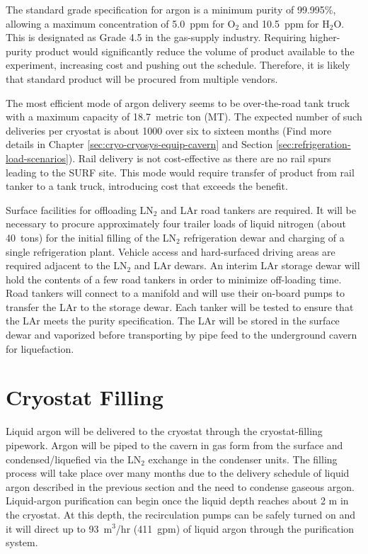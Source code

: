 The standard grade specification for argon is a minimum purity of
 99.995\%, allowing a maximum concentration of 5.0~ppm for O$_2$ 
and 10.5~ppm for H$_{2}$O.  This is designated as Grade 4.5 in 
the gas-supply industry.  Requiring higher-purity product would 
significantly reduce the volume of product available to the 
experiment, increasing cost and pushing out the schedule.  
Therefore, it is likely that standard product will be 
procured from multiple vendors.  

The most efficient mode of argon delivery seems to be
over-the-road tank truck with a maximum capacity of 18.7~metric ton (MT).  
The expected number of such deliveries per cryostat is about 1000 
over six to sixteen months (Find more details in 
Chapter \ref{sec:cryo-cryosys-equip-cavern} and Section 
\ref{sec:refrigeration-load-scenarios}). 
Rail delivery is not cost-effective as there are no rail spurs leading
to the SURF site. This mode would require transfer of product from rail 
tanker to a tank truck, introducing cost that exceeds the benefit.

Surface facilities for offloading LN$_{2}$ and LAr road tankers are 
required. It will be necessary to  procure approximately four trailer 
loads of liquid nitrogen (about 40~tons) for the initial filling of 
the LN$_{2}$ refrigeration dewar and charging of a single refrigeration 
plant. Vehicle access and hard-surfaced driving areas are required 
adjacent to the LN$_{2}$ and LAr dewars. An interim 
LAr storage dewar will hold the contents of a few road tankers in order 
to minimize off-loading time.  Road tankers will connect to a 
manifold and will use their on-board pumps to transfer the LAr 
to the storage dewar. Each tanker will be tested to ensure that 
the LAr meets the purity specification. The LAr will be 
stored in the surface dewar and vaporized before transporting 
by pipe feed to the underground cavern for liquefaction.

\section{Cryostat Filling}

Liquid argon will be delivered to the cryostat through the 
cryostat-filling pipework. Argon will be piped to the cavern 
in gas form from the surface and condensed/liquefied via the 
LN$_{2}$ exchange in the condenser units. The filling process 
will take place over many months due to the delivery schedule 
of liquid argon described in the previous section and the 
need to condense gaseous argon. Liquid-argon purification 
can begin once the liquid depth reaches about 2 m in the cryostat. 
At this depth, the recirculation pumps can be safely
turned on and it will direct up to 93~m$^{3}$/hr (411~gpm) 
of liquid argon through the purification system.

